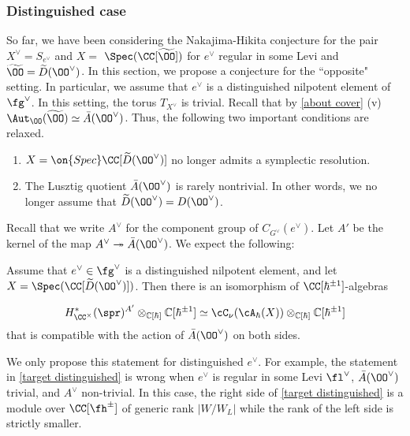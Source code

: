 \documentclass[12pt]{amsart}
\begin{document}
\subsubsection{Distinguished case} So far, we have been considering the Nakajima-Hikita conjecture for the pair $X^\vee= S_{e^\vee}$ and $X=$ $\Spec(\CC[\widetilde{\OO}])$ for $e^\vee$ regular in some Levi and $\widetilde{\OO}=\widetilde{D}(\OO^\vee)$. In this section, we propose a conjecture for the ``opposite" setting. In particular, we assume that $e^\vee$ is a distinguished nilpotent element of $\fg^\vee$. In this setting, the torus $T_{X^\vee}$ is trivial. Recall that by \cref{about cover} (v) $\Aut_\OO (\widetilde{\OO})\simeq \bar{A}(\OO^\vee)$. Thus, the following two important conditions are relaxed.
\begin{enumerate}
    \item $X=\on{Spec}\CC[\widetilde{D}(\OO^\vee)]$ no longer admits a symplectic resolution.
    \item The Lusztig quotient $\Bar{A}(\OO^\vee)$ is rarely nontrivial. In other words, we no longer assume that $\widetilde{D}(\OO^\vee)= D(\OO^\vee)$.
\end{enumerate}
Recall that we write $A^\vee$ for the component group of $C_{G^\vee}(e^\vee)$. Let $A'$ be the kernel of the map $A^\vee\twoheadrightarrow \Bar{A}(\OO^\vee)$. We expect the following:
    \begin{conj}\label{target distinguished}
        Assume that $e^\vee\in \fg^\vee$ is a distinguished nilpotent element, and let $X=\Spec(\CC[\widetilde{D}(\OO^\vee)])$. Then there is an isomorphism of $\CC[\hbar^{\pm 1}]$-algebras
        
    \begin{equation*} 
        H^{*}_{\CC^\times}(\spr)^{A'} \otimes_{\mathbb{C}[\hbar]} \mathbb{C}[\hbar^{\pm 1}] \simeq \cC_\nu(\cA_\hbar(X)) \otimes_{\mathbb{C}[\hbar]} \mathbb{C}[\hbar^{\pm 1}] 
    \end{equation*}
that is compatible with the action of $\Bar{A}(\OO^\vee)$ on both sides.  
    \end{conj}

    
    \begin{warning}
    We only propose this statement for distinguished $e^\vee$. For example, the statement in \cref{target distinguished} is wrong when $e^\vee$ is regular in some Levi $\fl^\vee$, $\Bar{A}(\OO^\vee)$ trivial, and $A^\vee$ non-trivial. In this case, the right side of \cref{target distinguished} is a module over $\CC[\fh^\pm]$ of generic rank $|W/W_L|$ while the rank of the left side is strictly smaller.
\end{warning}
\end{document}
